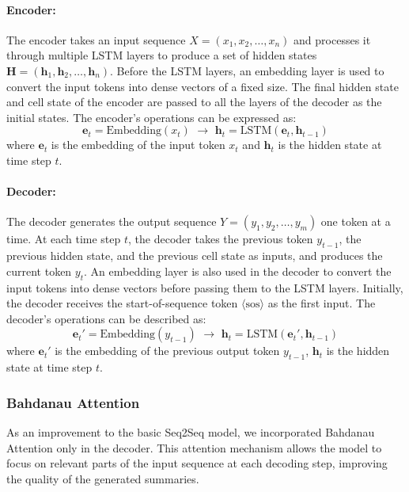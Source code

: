 \documentclass[a4paper, 11pt]{article}
\begin{document}
\paragraph{Encoder:}
The encoder takes an input sequence \( X = (x_1, x_2, \ldots, x_n) \) and processes it through multiple LSTM layers to produce a set of hidden states \( \mathbf{H} = (\mathbf{h}_1, \mathbf{h}_2, \ldots, \mathbf{h}_n) \). Before the LSTM layers, an embedding layer is used to convert the input tokens into dense vectors of a fixed size. The final hidden state and cell state of the encoder are passed to all the layers of the decoder as the initial states. The encoder's operations can be expressed as:
\begin{equation}
    \mathbf{e}_t = \text{Embedding}(x_t) \,\, \rightarrow \,\, \mathbf{h}_t = \text{LSTM}(\mathbf{e}_t, \mathbf{h}_{t-1})
\end{equation}
where \( \mathbf{e}_t \) is the embedding of the input token \( x_t \) and \( \mathbf{h}_t \) is the hidden state at time step \( t \).

\paragraph{Decoder:}
The decoder generates the output sequence \( Y = (y_1, y_2, \ldots, y_m) \) one token at a time. At each time step \( t \), the decoder takes the previous token \( y_{t-1} \), the previous hidden state, and the previous cell state as inputs, and produces the current token \( y_t \). An embedding layer is also used in the decoder to convert the input tokens into dense vectors before passing them to the LSTM layers. Initially, the decoder receives the start-of-sequence token \( \langle \text{sos} \rangle \) as the first input. The decoder's operations can be described as:
\begin{equation}
    \mathbf{e}_t' = \text{Embedding}(y_{t-1}) \,\, \rightarrow \,\, \mathbf{h}_t = \text{LSTM}(\mathbf{e}_t', \mathbf{h}_{t-1})
\end{equation}
where \( \mathbf{e}_t' \) is the embedding of the previous output token \( y_{t-1} \), \( \mathbf{h}_t \) is the hidden state at time step \( t \).

\subsubsection{Bahdanau Attention}

As an improvement to the basic Seq2Seq model, we incorporated Bahdanau Attention\cite{bahdanau2014neural} only in the decoder. This attention mechanism allows the model to focus on relevant parts of the input sequence at each decoding step, improving the quality of the generated summaries.
\end{document}
